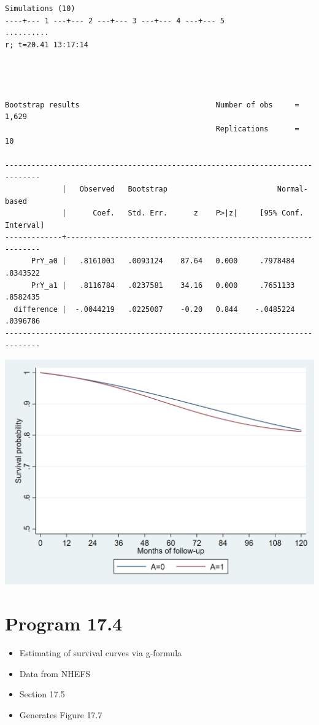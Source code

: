 \documentclass[
  10pt,
]{book}
\providecommand{\tightlist}{%
  \setlength{\itemsep}{0pt}\setlength{\parskip}{0pt}}
\begin{document}
\begin{verbatim}
Simulations (10)
----+--- 1 ---+--- 2 ---+--- 3 ---+--- 4 ---+--- 5 
..........
r; t=20.41 13:17:14




Bootstrap results                               Number of obs     =      1,629
                                                Replications      =         10

------------------------------------------------------------------------------
             |   Observed   Bootstrap                         Normal-based
             |      Coef.   Std. Err.      z    P>|z|     [95% Conf. Interval]
-------------+----------------------------------------------------------------
      PrY_a0 |   .8161003   .0093124    87.64   0.000     .7978484    .8343522
      PrY_a1 |   .8116784   .0237581    34.16   0.000     .7651133    .8582435
  difference |  -.0044219   .0225007    -0.20   0.844    -.0485224    .0396786
------------------------------------------------------------------------------
\end{verbatim}

\begin{center}\includegraphics[width=0.85\linewidth]{./figs/stata-fig-17-3} \end{center}

\hypertarget{program-17.4}{%
\section{Program 17.4}\label{program-17.4}}

\begin{itemize}
\tightlist
\item
  Estimating of survival curves via g-formula
\item
  Data from NHEFS
\item
  Section 17.5
\item
  Generates Figure 17.7
\end{itemize}
\end{document}
